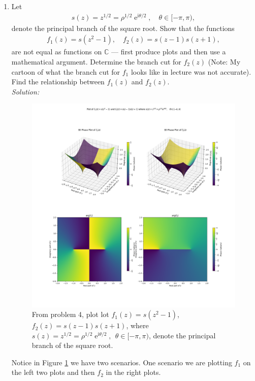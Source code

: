 \documentclass[10pt]{amsart}
\newcommand{\I}{\mathrm{i}}
\DeclareMathOperator{\E}{e}
\theoremstyle{nonumberplain}
\begin{document}
\begin{enumerate}[label={\bf {\arabic*}:}]
\item Let
  \begin{align*}
    s(z) = z^{1/2} = \rho^{1/2} \E^{\I \theta/2}, \quad \theta \in [-\pi,\pi),
  \end{align*}
  denote the principal branch of the square root.  Show that the
  functions
  \begin{align*}
    f_1(z) = s(z^2 -1), \quad f_2(z) = s(z-1) s(z+1),
  \end{align*}
  are not equal as functions on $\mathbb C$ --- first produce plots and then use a mathematical argument.  Determine the branch cut for $f_2(z)$ (Note: My
  cartoon of what the branch cut for $f_1$ looks like in lecture was
  not accurate).  Find the relationship between $f_1(z)$ and $f_2(z)$.\\
\textit{Solution:} \\
\begin{figure}[h]
	\centering
	\includegraphics[width=1\textwidth]{problem_4_vis.png}
 	\caption{
	From problem 4, plot lot $f_1(z) = s(z^2 -1)$, $f_2(z) = s(z-1) s(z+1)$, where $s(z) = z^{1/2} = \rho^{1/2} \E^{\I \theta/2},\:\:
	\theta \in [-\pi,\pi)$, denote the principal branch of the square root.}\label{fig:f1}
\end{figure}
\noindent
Notice in Figure \ref{fig:f1} we have two scenarios.
One scenario we are plotting $f_1$ on the left two plots and then $f_2$ in the right plots.

\end{enumerate}
\end{document}
